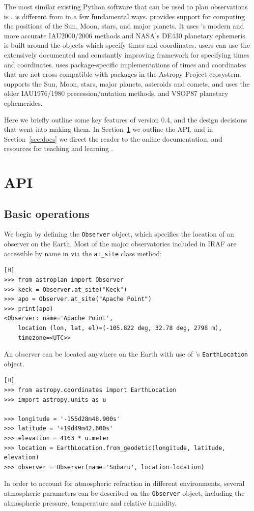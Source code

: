 The most similar existing Python software that can be used to plan observations is \pyephem \citep{pyephem}. \astroplan is different from \pyephem in a few fundamental ways. \astroplan provides support for computing the positions of the Sun, Moon, stars, and major planets. It uses \astropy's modern and more accurate IAU2000/2006 methods and NASA's DE430 planetary ephemeris. \astroplan is built around the \astropy objects which specify times and coordinates. \astroplan users can use the extensively documented and constantly improving \astropy framework for specifying times and coordinates. \pyephem uses package-specific implementations of times and coordinates that are not cross-compatible with packages in the Astropy Project ecosystem. \pyephem supports the Sun, Moon, stars, major planets, asteroids and comets, and uses the older IAU1976/1980 precession/nutation methods, and VSOP87 planetary ephemerides.

Here we briefly outline some key features of \astroplan version 0.4, and the design decisions that went into making them. In Section~\ref{sec:api} we outline the \astroplan API, and in Section~\ref{sec:docs} we direct the reader to the online documentation, and resources for teaching and learning \astroplan.

\section{API} \label{sec:api} 

\subsection{Basic operations}

We begin by defining the \texttt{Observer} object, which specifies the location of an observer on the Earth. Most of the major observatories included in IRAF \citep{IRAF} are accessible by name in \astroplan via the \texttt{at\_site} class method:
\begin{lstlisting}[caption=Define a common observer][H]
>>> from astroplan import Observer
>>> keck = Observer.at_site("Keck") 
>>> apo = Observer.at_site("Apache Point")
>>> print(apo)
<Observer: name='Apache Point',
    location (lon, lat, el)=(-105.822 deg, 32.78 deg, 2798 m),
    timezone=<UTC>>
\end{lstlisting}
An observer can be located anywhere on the Earth with use of \astropy's \texttt{EarthLocation} object.
\begin{lstlisting}[caption=Define a custom observer][H]
>>> from astropy.coordinates import EarthLocation
>>> import astropy.units as u

>>> longitude = '-155d28m48.900s'
>>> latitude = '+19d49m42.600s'
>>> elevation = 4163 * u.meter
>>> location = EarthLocation.from_geodetic(longitude, latitude, elevation)
>>> observer = Observer(name='Subaru', location=location)
\end{lstlisting}
In order to account for atmospheric refraction in different environments, several atmospheric parameters can be described on the \texttt{Observer} object, including the atmospheric pressure, temperature and relative humidity. 

